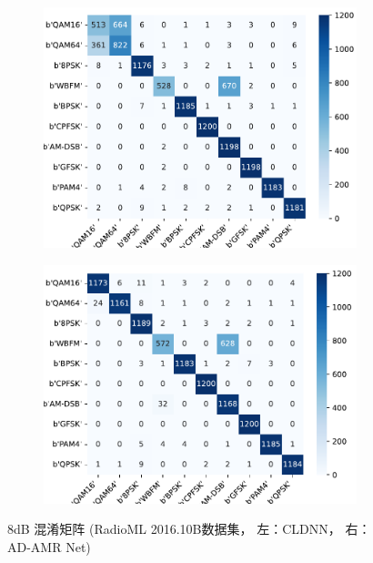\begin{figure}[ht]
    \centering
    \begin{subfigure}[b]{0.45\textwidth}
      \includegraphics[width=\textwidth]{Image/cldnn_16b.pdf}
      \label{fig:image1}
    \end{subfigure}
    \hfill
    \begin{subfigure}[b]{0.45\textwidth}
      \includegraphics[width=\textwidth]{Image/proposed_16b.pdf}
      \label{fig:image2}
    \end{subfigure}
    \caption{8dB 混淆矩阵 (RadioML 2016.10B数据集， 左：CLDNN， 右：AD-AMR Net)}
    \label{fig:16a_matrix}
  \end{figure}

